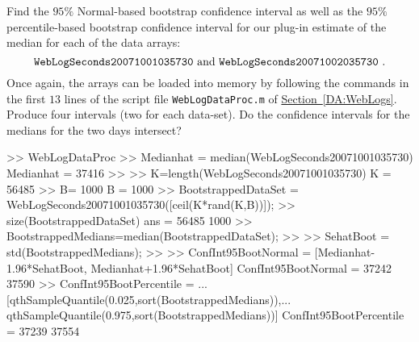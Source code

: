 \begin{labwork}
Find the $95\%$ Normal-based bootstrap confidence interval as well as the  $95\%$ percentile-based bootstrap confidence interval for our plug-in estimate of the median for each of the data arrays:
\[
\text{{\tt WebLogSeconds20071001035730} and {\tt WebLogSeconds20071002035730} .}
\]
Once again, the arrays can be loaded into memory by following the commands in the first $13$ lines of the script file {\tt WebLogDataProc.m} of \hyperref[DA:WebLogs]{Section~\ref*{DA:WebLogs}}.  Produce four intervals (two for each data-set).  Do the confidence intervals for the medians for the two days intersect?
\begin{VrbM}
>> WebLogDataProc %
>> Medianhat = median(WebLogSeconds20071001035730) %
Medianhat =       37416
>> %
>> K=length(WebLogSeconds20071001035730) 
K =       56485
>> B= 1000 %
B =        1000
>> BootstrappedDataSet = WebLogSeconds20071001035730([ceil(K*rand(K,B))]); 
>> size(BootstrappedDataSet) %
ans =       56485        1000
>> BootstrappedMedians=median(BootstrappedDataSet); %
>> %
>> SehatBoot = std(BootstrappedMedians); %
>> %
>> ConfInt95BootNormal = [Medianhat-1.96*SehatBoot, Medianhat+1.96*SehatBoot] 
ConfInt95BootNormal =    37242    37590
>> %
ConfInt95BootPercentile = ...
    [qthSampleQuantile(0.025,sort(BootstrappedMedians)),...
    qthSampleQuantile(0.975,sort(BootstrappedMedians))]
ConfInt95BootPercentile =   37239    37554
\end{VrbM}
\end{labwork}

